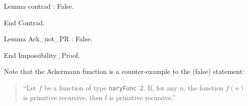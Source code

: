 \begin{Coqsrc}
    Lemma contrad : False.
   
  End Contrad.

  Lemma Ack_not_PR : False.

End Impossibility_Proof.
\end{Coqsrc}









      


\begin{remark}
Note that the Ackermann function is a counter-example to the (false) statement:
\begin{quote}
{\color{red}
  ``Let $f$ be a function of type \texttt{naryFunc\,2}. If, for any $n$, the fonction $f(n)$ is primitive recursive, then f is primitive recursive.''}
\end{quote}
\end{remark}




